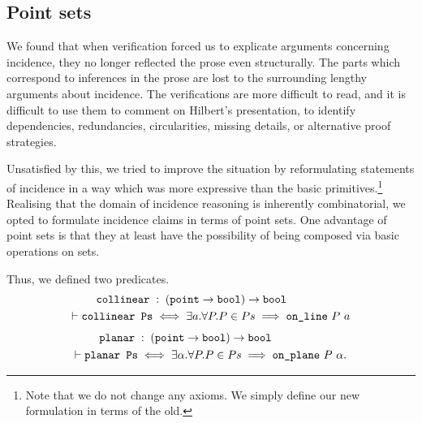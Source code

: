 \subsection{Point sets}
We found that when verification forced us to explicate arguments concerning incidence, they no longer reflected the prose even structurally. The parts which correspond to inferences in the prose are lost to the surrounding lengthy arguments about incidence. The verifications are more difficult to read, and it is difficult to use them to comment on Hilbert's presentation, to identify dependencies, redundancies, circularities, missing details, or alternative proof strategies.

Unsatisfied by this, we tried to improve the situation by reformulating statements of incidence in a way which was more expressive than the basic primitives.\footnote{Note that we do not change any axioms. We simply define our new formulation in terms of the old.} Realising that the domain of incidence reasoning is inherently combinatorial, we opted to formulate incidence claims in terms of point sets. One advantage of point sets is that they at least have the possibility of being composed via basic operations on sets.

Thus, we defined two predicates.
\begin{align*}
\texttt{collinear}\;&:\;(\texttt{point}\rightarrow\texttt{bool})\rightarrow\texttt{bool}
\\\vdash\texttt{collinear\ Ps} &\iff \exists a. \forall P. P \in Ps \implies \texttt{on\_line}\ P\ a
\end{align*}
\begin{align*}
\texttt{planar}\;&:\;(\texttt{point}\rightarrow\texttt{bool})\rightarrow\texttt{bool}
\\\vdash\texttt{planar\ Ps} &\iff \exists \alpha. \forall P. P \in Ps \implies \texttt{on\_plane}\ P\ \alpha.
\end{align*}


